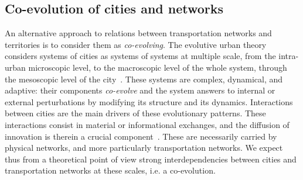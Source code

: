 




\subsection{Co-evolution of cities and networks}


An alternative approach to relations between transportation networks and territories is to consider them as \emph{co-evolving}. The evolutive urban theory considers systems of cities as systems of systems at multiple scale, from the intra-urban microscopic level, to the macroscopic level of the whole system, through the mesoscopic level of the city~\citep{pumain2008socio}. These systems are complex, dynamical, and adaptive: their components \emph{co-evolve} and the system answers to internal or external perturbations by modifying its structure and its dynamics. Interactions between cities are the main drivers of these evolutionary patterns. These interactions consist in material or informational exchanges, and the diffusion of innovation is therein a crucial component~\citep{pumain2010theorie}. These are necessarily carried by physical networks, and more particularly transportation networks. We expect thus from a theoretical point of view strong interdependencies between cities and transportation networks at these scales, i.e. a co-evolution.

